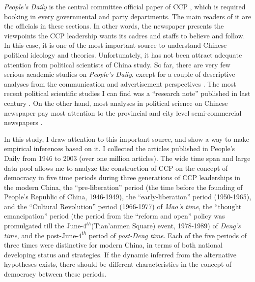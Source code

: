 \documentclass[abstracton,UTF8]{ctexart}
\begin{document}
\textit{People's Daily} is the central committee official paper of CCP \citep{People}, which is required booking in every governmental and party departments. The main readers of it are the officials in these sections. In other words, the newspaper presents the viewpoints the CCP leadership wants its cadres and staffs to believe and follow. In this case, it is one of the most important source to understand Chinese political ideology and theories. Unfortunately, it has not been attract adequate attention from political scientists of China study. So far, there are very few serious academic studies on \textit{People's Daily}, except for a couple of descriptive analyses from the communication and advertisement perspectives \citep{Chute1995,Swanson1996}. The most recent political scientific studies I can find was a ``research note'' published in last century \citep{Wu1994}. On the other hand, most analyses in political science on Chinese newspaper pay most attention to the provincial and city level semi-commercial newspapers \citep{Shirk2010,Reich2014}. 

In this study, I draw attention to this important source, and show a way to make empirical inferences based on it. I collected the articles published in People's Daily from 1946 to 2003 (over one million articles). The wide time span and large data pool allows me to analyze the construction of CCP on the concept of democracy in five time periods during three generations of CCP leaderships in the modern China, the ``pre-liberation'' period (the time before the founding of People's Republic of China, 1946-1949), the ``early-liberation'' period (1950-1965), and the ``Cultural Revolution'' period (1966-1977) of \textit{Mao's time}, the ``thought emancipation'' period (the period from the ``reform and open'' policy was promulgated till the June-$ 4^{th} $(Tian'anmen Square) event, 1978-1989) of \textit{Deng's time}, and the post-June-$ 4^{th} $ period of \textit{post-Deng time}. Each of the five periods of three times were distinctive for modern China, in terms of both national developing status and strategies. If the dynamic inferred from the alternative hypotheses exists, there should be different characteristics in the concept of democracy between these periods.
\end{document}
